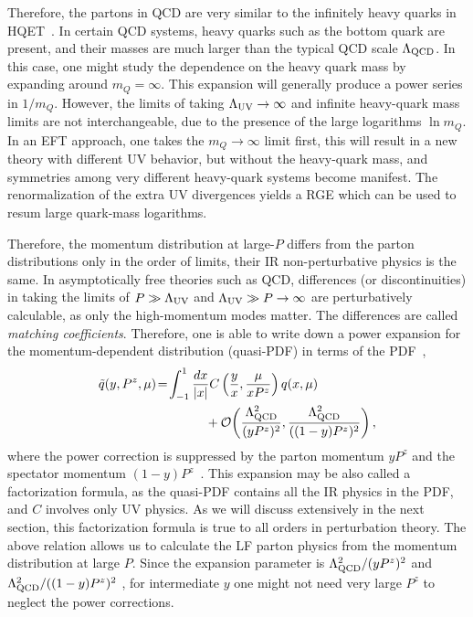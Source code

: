 Therefore, the partons in QCD are very similar
to the infinitely heavy quarks in HQET~\cite{Manohar:2000dt}. In certain
QCD systems, heavy quarks such as the bottom quark are present, and their
masses are much larger than the typical QCD scale $\Lambda_{\rm QCD}$.
In this case, one might study the dependence on the heavy quark mass
by expanding around $m_Q=\infty$. This expansion will generally
produce a power series in $1/m_Q$. However, the limits
of taking $\Lambda_{\rm UV}\to\infty$ and infinite heavy-quark
mass {limits} are not interchangeable, due to the presence
of the large logarithms $\ln m_Q$. In an EFT approach,
one takes the $m_Q\to\infty$ limit first, this will result in
a new theory with different UV behavior, but without the heavy-quark
mass, and symmetries among very different heavy-quark
systems become manifest. The renormalization
of the extra UV divergences yields a RGE
which can be used to resum large quark-mass logarithms.

Therefore, the momentum distribution at large-$P$ differs
from the parton distributions only in the order
of limits, their IR non-perturbative physics is
the same. In asymptotically free theories such as QCD, differences (or discontinuities) in taking the limits of $P\gg \Lambda_{\rm UV}$ and $\Lambda_{\rm UV} \gg P\to\infty$ are
perturbatively calculable, as only the high-momentum modes matter.
The differences are called {\it matching coefficients}.
Therefore, one is able to write down a power expansion for the momentum-dependent distribution (quasi-PDF) in terms of the PDF~\cite{Xiong:2013bka,Ma:2014jla,Ma:2017pxb,Izubuchi:2018srq},
\begin{align}\label{eq:fact_0}
	\tilde q(y, P^z, \mu)\! &=\! \int_{-1}^{1} \frac{dx}{|x|} C\left(\frac{y}{x}, \frac{\mu}{xP^z}\right) q(x,\mu)
	\nonumber \\
	&\qquad\qquad + {\cal O}\bigg(\frac{\Lambda_{\text{QCD}}^2}{(yP^z)^2},
	\frac{\Lambda_{\text{QCD}}^2}{((1-y)P^z)^2}
	\bigg)\,,
\end{align}
where the power correction is suppressed by the parton momentum $yP^z$ and  the spectator momentum $(1-y)P^z$~\cite{Ji:2020brr}.
This expansion {may be} also called
a factorization formula, as the quasi-PDF contains all the IR physics in the PDF, and $C$ involves only UV physics.
As we will discuss extensively in
the next section, this factorization formula is true to all orders in perturbation theory.
The above relation allows us to calculate the
LF parton physics from the momentum distribution at large
$P$. Since the expansion parameter is $\Lambda_{\rm QCD}^2/(yP^z)^2$ and $\Lambda_{\rm QCD}^2/((1-y)P^z)^2$ ,
for intermediate $y$ one might not need very large $P^z$ to neglect
the power corrections.


